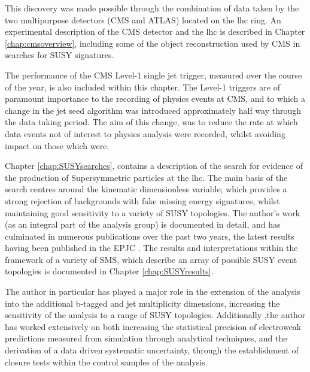 This discovery was made possible through the combination of data taken by the two multipurpose detectors (\acf{CMS} and \ac{ATLAS}) located on the \ac{lhc} ring. An experimental description of the \ac{CMS} detector and the \ac{lhc} is described in Chapter \ref{chap:cmsoverview}, including some of the object reconstruction used by \ac{CMS} in searches for \ac{SUSY} signatures. 

The performance of the \ac{CMS} Level-1 single jet trigger, measured over the course of the year, is also included within this chapter. The Level-1 triggers are of paramount importance to the recording of physics events at \ac{CMS}, and to which a change in the jet seed algorithm was introduced approximately half way through the data taking period. The aim of this change, was to reduce the rate at which data events not of interest to physics analysis were recorded, whilst avoiding impact on those which were.

Chapter \ref{chap:SUSYsearches}, contains a description of the search for evidence of the production of Supersymmetric particles at the \ac{lhc}. The main basis of the search centres around the kinematic dimensionless \alphat variable; which provides a strong rejection of backgrounds with fake missing energy signatures, whilst maintaining good sensitivity to a variety of \ac{SUSY} topologies. The author's work (as an integral part of the analysis group) is documented in detail, and has culminated in numerous publications over the past two years, the latest results having been published in the \acf{EPJC} \cite{ra1_epjc}.  The results and interpretations within the framework of a variety of \acf{SMS}, which describe an array of possible \ac{SUSY} event topologies is documented in Chapter \ref{chap:SUSYresults}. 

The author in particular has played a major role in the extension of the \alphat analysis into the additional b-tagged and jet multiplicity dimensions, increasing the sensitivity of the analysis to a range of \ac{SUSY} topologies. Additionally ,the author has worked extensively on both increasing the statistical precision of electroweak predictions measured from simulation through analytical techniques, and the derivation of a data driven systematic uncertainty, through the establishment of closure tests within the control samples of the analysis. 

